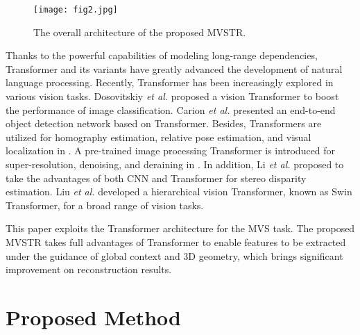 \documentclass[10pt,twocolumn,letterpaper]{article}
\begin{document}
\begin{figure*}[!t]
	\centering
	\texttt{[image: fig2.jpg]}
	\caption{The overall architecture of the proposed MVSTR.}
	\label{fig.2}
\end{figure*}

Thanks to the powerful capabilities of modeling long-range dependencies, Transformer \cite{transformer} and its variants \cite{reformer,lineartransformer,setransformer} have greatly advanced the development of natural language processing. Recently, Transformer has been increasingly explored in various vision tasks. Dosovitskiy \textit{et al.} \cite{vit} proposed a vision Transformer to boost the performance of image classification. Carion \textit{et al.} \cite{detr} presented an end-to-end object detection network based on Transformer. Besides, Transformers are utilized for homography estimation, relative pose estimation, and visual localization in \cite{loftr}. A pre-trained image processing Transformer is introduced for super-resolution, denoising, and deraining in \cite{ipt}. In addition, Li \textit{et al.} \cite{sttr} proposed to take the advantages of both CNN and Transformer for stereo disparity estimation. Liu \textit{et al.} \cite{swin} developed a hierarchical vision Transformer, known as Swin Transformer, for a broad range of vision tasks.

This paper exploits the Transformer architecture for the MVS task. The proposed MVSTR takes full advantages of Transformer to enable features to be extracted under the guidance of global context and 3D geometry, which brings significant improvement on reconstruction results.

\section{Proposed Method}

\end{document}

